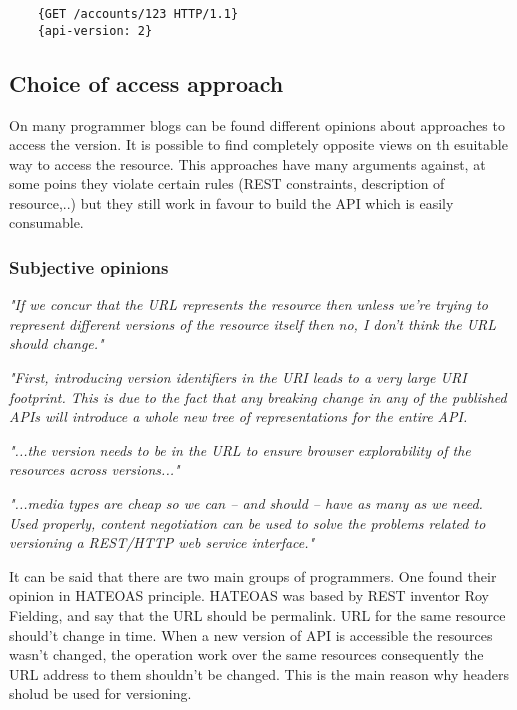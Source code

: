 \begin{lstlisting}
    {GET /accounts/123 HTTP/1.1}
    {api-version: 2}
\end{lstlisting}

\subsection{Choice of access approach}

On many programmer blogs can be found different opinions about approaches to access the version. It is possible to find completely opposite views on th esuitable way to access the resource. This approaches have many arguments against, at some poins they violate certain rules (REST constraints, description of resource,..) but they still work in favour to build the API which is easily consumable.

\subsubsection{Subjective opinions}

\emph{"If we concur that the URL represents the resource then unless we’re trying to represent different versions of the resource itself then no, I don’t think the URL should change."\cite{website:wrong-ways}}
\bigskip

\emph{"First, introducing version identifiers in the URI leads to a very large URI footprint. This is due to the fact that any breaking change in any of the published APIs will introduce a whole new tree of representations for the entire API.\cite{website:versioning-rest-api}}
\bigskip

\emph{"...the version needs to be in the URL to ensure browser explorability of the resources across versions..."\cite{website:best-practices-rest}}
\bigskip

\emph{"...media types are cheap so we can – and should – have as many as we need. Used properly, content negotiation can be used to solve the problems related to versioning a REST/HTTP web service interface."\cite{website:versioning-rest-web-services}}
\bigskip


It can be said that there are two main groups of programmers. One found their opinion in HATEOAS principle. HATEOAS was based by REST inventor Roy Fielding, and say that the URL should be permalink. URL for the same resource should't change in time. When a new version of API is accessible the resources wasn't changed, the operation work over the same resources consequently the URL address to them shouldn't be changed. This is the main reason why headers sholud be used for versioning. 

